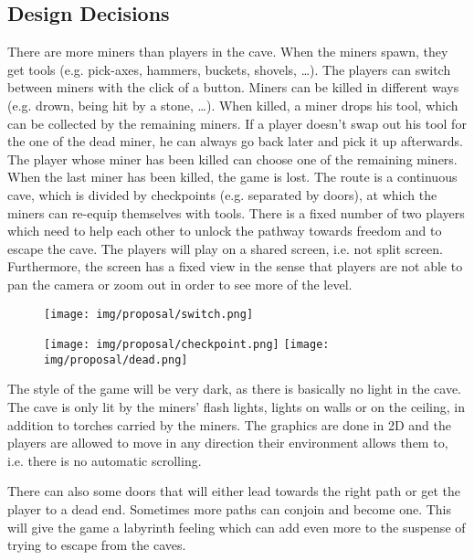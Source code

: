 \subsection{Design Decisions}

There are more miners than players in the cave. When the miners spawn, they get tools (e.g. pick-axes, hammers, buckets, shovels, …). The players can switch between miners with the click of a button. 
Miners can be killed in different ways (e.g. drown, being hit by a stone, …). When killed, a miner drops his tool, which can be collected by the remaining miners. If a player doesn't swap out his tool for the one of the dead miner, he can always go back later and pick it up afterwards. The player whose miner has been killed can choose one of the remaining miners. When the last miner has been killed, the game is lost.
The route is a continuous cave, which is divided by checkpoints (e.g. separated by doors), at which the miners can re-equip themselves with tools.
There is a fixed number of two players which need to help each other to unlock the pathway towards freedom and to escape the cave. The players will play on a shared screen, i.e. not split screen. Furthermore, the screen has a fixed view in the sense that players are not able to pan the camera or zoom out in order to see more of the level.
\begin{figure}
    \centering
    \texttt{[image: img/proposal/switch.png]}
\end{figure}


\begin{figure}[h]
    \centering
    \texttt{[image: img/proposal/checkpoint.png]}
    \texttt{[image: img/proposal/dead.png]}
\end{figure}


The style of the game will be very dark, as there is basically no light in the cave. The cave is only lit by the miners’ flash lights, lights on walls or on the ceiling, in addition to torches carried by the miners. The graphics are done in 2D and the players are allowed to move in any direction their environment allows them to, i.e. there is no automatic scrolling. 

There can also some doors that will either lead towards the right path or get the player to a dead end. Sometimes more paths can conjoin and become one. This will give the game a labyrinth feeling which can add even more to the suspense of trying to escape from the caves. 

